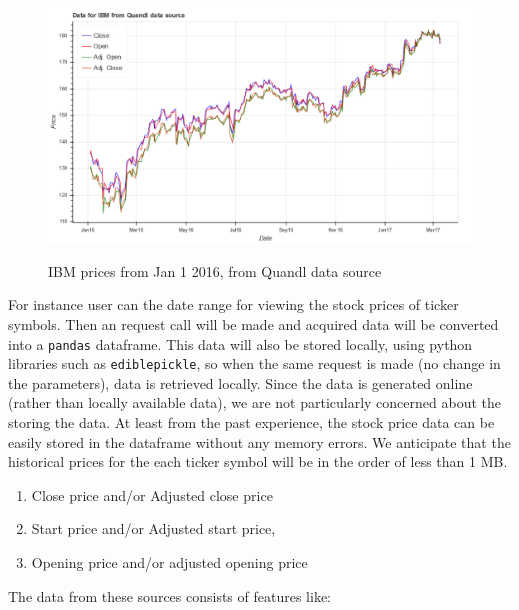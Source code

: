 \documentclass[12pt]{article}
\begin{document}
\begin{figure}[!htbp]
\begin{center}
\includegraphics[height=0.5\textheight,width=\textwidth]{price_plot_IBM.png}
\label{fig:ibm}
\caption{IBM prices from Jan 1 2016, from Quandl data source}
\end{center}
\end{figure}

For instance user can the date range for viewing the stock prices of ticker symbols. Then an request call will be made and acquired data will be converted into a \texttt{pandas}  dataframe. This data will also be stored locally, using python libraries such as \texttt{ediblepickle}, so when the same request is made (no change in the parameters), data is retrieved locally. Since the data is generated online (rather than locally available data), we are not particularly concerned about the storing the data. At least from the past experience, the stock price data can be easily stored in the dataframe without any memory errors. We anticipate that the historical prices for the each ticker symbol will be in the order of less than 1 MB.

\begin{enumerate}
\item Close price and/or Adjusted close price
\item Start price and/or Adjusted start price,
\item Opening price  and/or adjusted opening price
\end{enumerate}



The data from these sources consists of features like:
\end{document}

